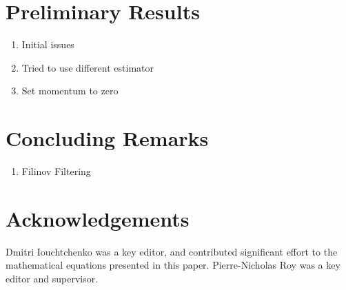 \documentclass[12pt,letterpaper,oneside,final,titlepage]{article}               %
\numberwithin{equation}{section} %
\begin{document}
\section{Preliminary Results}
\begin{enumerate}
	\item Initial issues
	\item Tried to use different estimator
	\item Set momentum to zero
\end{enumerate}

\section{Concluding Remarks}
\begin{enumerate}
	\item Filinov Filtering
\end{enumerate}


\section{Acknowledgements}
Dmitri Iouchtchenko was a key editor, and contributed significant effort to the mathematical equations presented in this paper. Pierre-Nicholas Roy was a key editor and supervisor.

\renewcommand*{\bibfont}{\scriptsize}
\printbibliography
\end{document}
